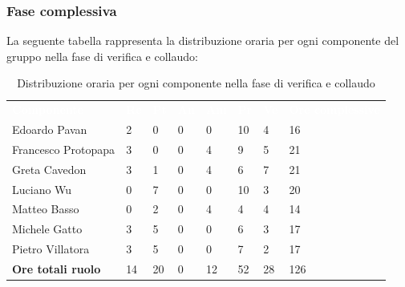 \subsubsection{Fase complessiva}
La seguente tabella rappresenta la distribuzione oraria per ogni componente del gruppo nella fase di verifica e collaudo:
\begin{table}[!htbp]
\begin{center}
\renewcommand{\arraystretch}{1.25}
\begin{tabular}{ m{}<{\centering}  m{}<{\centering} m{}<{\centering} m{}<{\centering}  m{}<{\centering}  m{}<{\centering}  m{}<{\centering}  m{}<{\centering}   }
	\rowcolor{darkblue}
	\textcolor{white}{\textbf{Componente}} &\textcolor{white}{\textbf{Re}}&\textcolor{white}{\textbf{Pt}}&\textcolor{white}{\textbf{An}}&\textcolor{white}{\textbf{Am}}&\textcolor{white}{\textbf{Pr}}&\textcolor{white}{\textbf{Ve}}&\textcolor{white}{\textbf{Ore complessive}}\\ 
	Edoardo Pavan & 2 & 0 & 0 & 0 & 10 & 4 & 16 \\	
	
	Francesco Protopapa & 3 & 0 & 0 & 4 & 9 & 5 & 21 \\

	Greta Cavedon & 3 & 1 & 0 & 4 & 6 & 7 & 21 \\
	
	Luciano Wu & 0 & 7 & 0 & 0 & 10 & 3 & 20 \\
	
	Matteo Basso & 0 & 2 & 0 & 4 & 4 & 4 & 14 \\
	
	Michele Gatto & 3 & 5 & 0 & 0 & 6 & 3 & 17 \\
	
	Pietro Villatora & 3 & 5 & 0 & 0 & 7 & 2 & 17 \\
	
	\textbf{Ore totali ruolo} & 14 & 20 & 0 & 12 & 52 & 28 & 126\\

\end{tabular}
\caption{Distribuzione oraria per ogni componente nella fase di verifica e collaudo}
\end{center}
\end{table}

